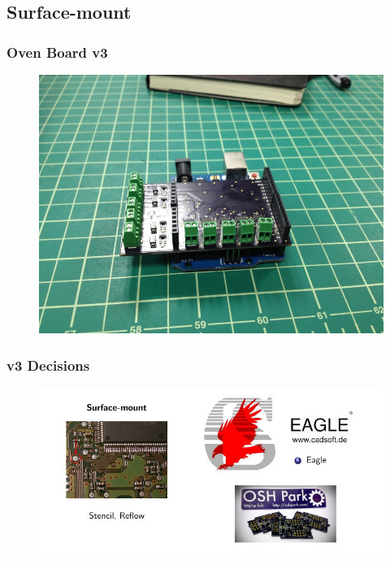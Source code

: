 \documentclass{beamer}
\begin{document}
\subsection{Surface-mount}
\begin{frame}
\frametitle{Oven Board v3}
\begin{figure}
\includegraphics[width=0.8\linewidth]{ovenboard3-side.png}
\end{figure}
\end{frame}

\begin{frame}
\frametitle{v3 Decisions}
\begin{figure}
\includegraphics[width=1.0\linewidth]{decisions2.jpg}
\end{figure}
\end{frame}

\end{document}
